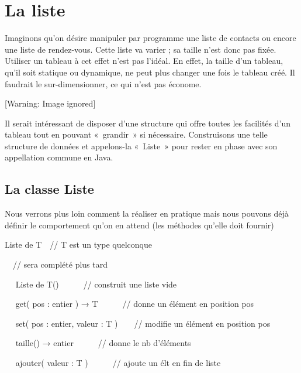 
\chapter[La liste]{
La liste}
{
Imaginons qu’on désire manipuler par programme une liste de contacts ou
encore une liste de rendez-vous. Cette liste va varier ; sa taille
n’est donc pas fixée. Utiliser un tableau à cet effet n’est pas
l’idéal. En effet, la taille d’un tableau, qu’il soit statique ou
dynamique, ne peut plus changer une fois le tableau créé. Il faudrait
le sur-dimensionner, ce qui n’est pas économe.}

\begin{center}
 [Warning: Image ignored] %

\end{center}
{
Il serait intéressant de disposer d’une structure qui offre toutes les
facilités d’un tableau tout en pouvant «~grandir~» si nécessaire.
Construisons une telle structure de données et appelons-la «~Liste~»
pour rester en phase avec son appellation commune en Java.}

\section{La classe Liste}
{
Nous verrons plus loin comment la réaliser en pratique mais nous pouvons
déjà définir le comportement qu’on en attend (les méthodes qu’elle doit
fournir)}

{\sffamily
{} Liste de T\ \ // T est un type quelconque}

{\sffamily
{}}

{\sffamily
\ \ // sera complété plus tard}

{\sffamily
{}}

{\sffamily
\ \  Liste de T()\ \ \ \ \ \ // construit
une liste vide}

{\sffamily
\ \  get( pos : entier ) → T\ \ \ \ \ \ // donne
un élément en position pos}

{\sffamily
\ \  set( pos : entier, valeur : T )\ \ \ \ //
modifie un élément en position pos}

{\sffamily
\ \  taille() → entier\ \ \ \ \ \ // donne le nb
d’éléments}

{\sffamily
\ \  ajouter( valeur : T )\ \ \ \ \ \ // ajoute
un élt en fin de liste}


